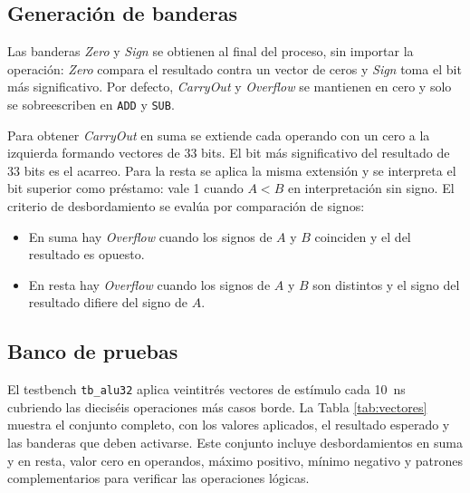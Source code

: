\documentclass[12pt,letterpaper]{article}
\begin{document}
\subsection{Generación de banderas}
Las banderas \textit{Zero} y \textit{Sign} se obtienen al final del proceso, sin importar la operación: \textit{Zero} compara el resultado contra un vector de ceros y \textit{Sign} toma el bit más significativo. Por defecto, \textit{CarryOut} y \textit{Overflow} se mantienen en cero y solo se sobreescriben en \texttt{ADD} y \texttt{SUB}.

Para obtener \textit{CarryOut} en suma se extiende cada operando con un cero a la izquierda formando vectores de 33 bits. El bit más significativo del resultado de 33 bits es el acarreo. Para la resta se aplica la misma extensión y se interpreta el bit superior como préstamo: vale 1 cuando $A < B$ en interpretación sin signo. El criterio de desbordamiento se evalúa por comparación de signos:

\begin{itemize}
  \item En suma hay \textit{Overflow} cuando los signos de $A$ y $B$ coinciden y el del resultado es opuesto.
  \item En resta hay \textit{Overflow} cuando los signos de $A$ y $B$ son distintos y el signo del resultado difiere del signo de $A$.
\end{itemize}

\subsection{Banco de pruebas}
El testbench \texttt{tb\_alu32} aplica veintitrés vectores de estímulo cada \SI{10}{\nano\second} cubriendo las dieciséis operaciones más casos borde. La Tabla \ref{tab:vectores} muestra el conjunto completo, con los valores aplicados, el resultado esperado y las banderas que deben activarse. Este conjunto incluye desbordamientos en suma y en resta, valor cero en operandos, máximo positivo, mínimo negativo y patrones complementarios para verificar las operaciones lógicas.
\end{document}
